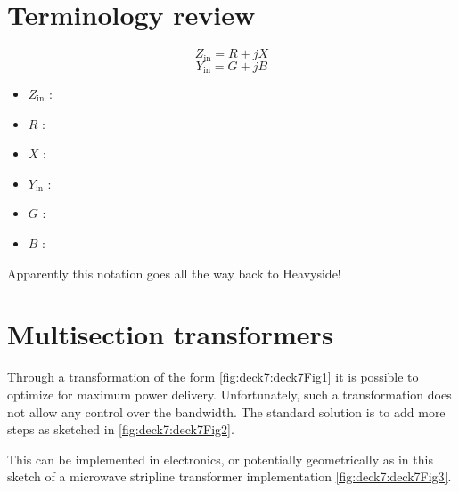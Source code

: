 
\section{Terminology review}

\begin{equation}\label{eqn:uwavesDeck7MultisectionTransformersCore:20}
Z_{\textrm{in}} = R + j X
\end{equation}
\begin{equation}\label{eqn:uwavesDeck7MultisectionTransformersCore:40}
Y_{\textrm{in}} = G + j B
\end{equation}

\begin{itemize}
\item \( Z_{\textrm{in}} \) : 
\item \( R \) : 
\item \( X \) : 
\item \( Y_{\textrm{in}} \) : 
\item \( G \) : 
\item \( B \) : 
\end{itemize}

Apparently this notation goes all the way back to Heavyside!

\section{Multisection transformers}

Through a transformation of the form \cref{fig:deck7:deck7Fig1} it is possible to optimize for maximum power delivery.  Unfortunately, such a transformation does not allow any control over the bandwidth.  The standard solution is to add more steps as sketched in \cref{fig:deck7:deck7Fig2}.


This can be implemented in electronics, or potentially geometrically as in this sketch of a microwave stripline transformer implementation \cref{fig:deck7:deck7Fig3}.


